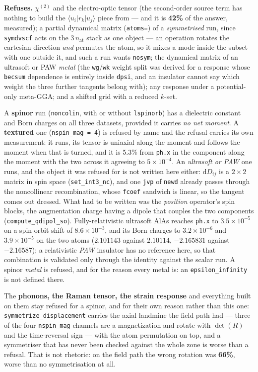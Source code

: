 \documentclass[11pt,a4paper]{article}
\newcommand{\code}[1]{\texttt{\small #1}}
\begin{document}
\begin{refuses}
\textbf{Refuses.} $\chi^{(2)}$ and the electro-optic tensor (the second-order
source term has nothing to build the $\langle u_i|r_k|u_j\rangle$ piece from ---
and it is \textbf{42\%} of the answer, measured);
a partial dynamical matrix (\code{atoms=}) of a
\emph{symmetrised} run, since \code{symdvscf} acts on the $3\,n_{\mathrm{at}}$
stack as one object --- an operation rotates the cartesian direction \emph{and}
permutes the atom, so it mixes a mode inside the subset with one outside it,
and such a run wants \code{nosym}; the dynamical matrix of an ultrasoft or PAW \emph{metal}
(the \code{wg}/\code{wk} weight split was derived for a response whose
\code{becsum} dependence is entirely inside \code{dpsi}, and an insulator cannot
say which weight the three further tangents belong with); any response under a
potential-only meta-GGA; and a shifted grid with a reduced $k$-set.

A \textbf{spinor} run (\code{noncolin}, with or without \code{lspinorb}) has a
dielectric constant and Born charges on all three datasets, provided it carries
\emph{no net moment}. A \textbf{textured} one
(\code{nspin\_mag = 4}) is refused by name and the refusal carries its own
measurement: it runs, its tensor is uniaxial along the moment and follows the
moment when that is turned, and it is 5.3\% from \code{ph.x} in the component
along the moment with the two across it agreeing to $5\times10^{-4}$. An
\emph{ultrasoft or PAW} one runs, and the object it was refused for is not
written here either: $\mathrm dD_{ij}$ is a $2\times2$ matrix in spin space
(\code{set\_int3\_nc}), and one \code{jvp} of \code{newd} already passes
through the noncollinear recombination, whose \code{fcoef} sandwich is linear,
so the tangent comes out dressed. What had to be written was the \emph{position}
operator's spin blocks, the augmentation charge having a dipole that couples the
two components (\code{compute\_qdipol\_so}). Fully-relativistic ultrasoft AlAs
reaches \code{ph.x} to $3.5\times10^{-5}$ on a spin-orbit shift of
$8.6\times10^{-3}$, and its Born charges to $3.2\times10^{-6}$ and
$3.9\times10^{-5}$ on the two atoms ($2.101143$ against $2.10114$, $-2.165831$
against $-2.16587$); a relativistic \emph{PAW} insulator has no reference here,
so that combination is validated only through the identity against the scalar
run. A spinor \emph{metal} is refused, and for the reason every metal is: an
\code{epsilon\_infinity} is not defined there.

The \textbf{phonons, the Raman tensor, the strain response} and everything
built on them stay refused for a spinor, and for their own reason rather than
this one: \code{symmetrize\_displacement} carries the axial landmine the field
path had --- three of the four \code{nspin\_mag} channels are a magnetization
and rotate with $\det(R)$ and the time-reversal sign --- with the atom
permutation on top, and a symmetriser that has never been checked against the
whole zone is worse than a refusal. That is not rhetoric: on the field path the
wrong rotation was \textbf{66\%}, worse than no symmetrisation at all.


\end{refuses}
\end{document}
